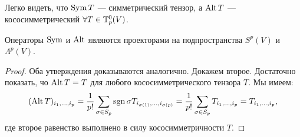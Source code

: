 Легко видеть, что $\operatorname{Sym} T$ --- симметрический тензор, а $\operatorname{Alt} T$ --- кососимметрический $\forall T \in \mathbb{T}_p^0(V)$.

\begin{proposal}
    Операторы $\operatorname{Sym}$ и $\operatorname{Alt}$ являются проекторами на подпространства $S^p(V)$ и $\Lambda^p(V)$.
\end{proposal}

\begin{proof}
    Оба утверждения доказываются аналогично. Докажем второе. Достаточно показать, чо $\operatorname{Alt} T = T$ для любого кососимметрического тензора $T$. Мы имеем:
    \[
        (\operatorname{Alt} T)_{i_1, \ldots, i_p} = \frac{1}{p!}\sum_{\sigma \in S_p}\operatorname{sgn}\sigma T_{i_{\sigma(1)}, \ldots, i_{\sigma(p)}} = \frac{1}{p!}\sum_{\sigma \in S_p}T_{i_1, \ldots, i_p} = T_{i_1, \ldots, i_p},
    \]
    где второе равенство выполнено в силу кососимметричности $T$.
\end{proof}

